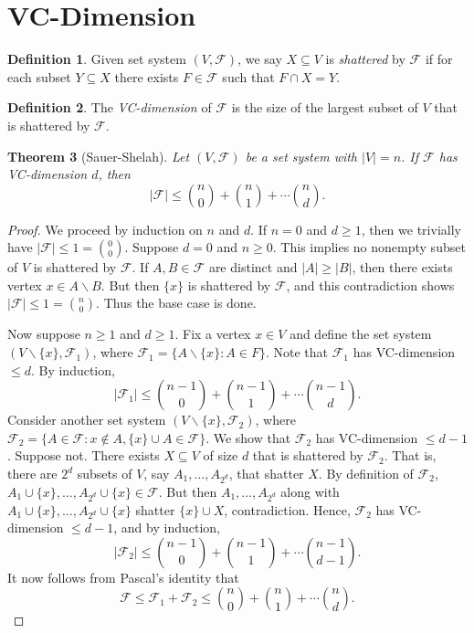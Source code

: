 \documentclass[12pt,reqno]{amsart}
\newtheorem{theorem}{Theorem}[section]
\theoremstyle{definition}
\newtheorem{definition}[theorem]{Definition}
\theoremstyle{remark}
\renewcommand{\leq}{\leqslant}
\renewcommand{\geq}{\geqslant}
\def\F{\mathcal{F}}
\numberwithin{equation}{section}
\begin{document}
\newpage

\section{VC-Dimension}

\begin{definition}
	Given set system $(V, \F)$, we say $X \subseteq V$ is \textit{shattered} by $\F$ if for each subset $Y \subseteq X$ there exists $F \in \F$ such that $F \cap X = Y$.
\end{definition}

\begin{definition}
	The \textit{VC-dimension} of $\F$ is the size of the largest subset of $V$ that is shattered by $\F$.
\end{definition}

\begin{theorem}[Sauer-Shelah]
	Let $(V, \F)$ be a set system with $|V| = n$. If $\F$ has VC-dimension $d$, then
	\[
		|\F| \leq \binom{n}{0} + \binom{n}{1} + \cdots \binom{n}{d}.
	\]
\end{theorem}

\begin{proof}
	We proceed by induction on $n$ and $d$. If $n = 0$ and $d \geq 1$, then we trivially have $|\F| \leq 1 = \binom{0}{0}$. Suppose $d = 0$ and $n \geq 0$. This implies no nonempty subset of $V$ is shattered by $\F$. If $A, B \in \F$ are distinct and $|A| \geq |B|$, then there exists vertex $x \in A \backslash B$. But then $\{x\}$ is shattered by $\F$, and this contradiction shows $|\F| \leq 1 = \binom{n}{0}$. Thus the base case is done.

	Now suppose $n \geq 1$ and $d \geq 1$. Fix a vertex $x \in V$ and define the set system $(V \backslash \{x\}, \F_1)$, where $\F_1 = \{A \backslash \{x\} : A \in F\}$. Note that $\F_1$ has VC-dimension $\leq d$. By induction, 
	\[
		|\F_1| \leq \binom{n - 1}{0} + \binom{n - 1}{1} + \cdots \binom{n - 1}{d}.
	\]
	Consider another set system $(V \backslash \{x\}, \F_2)$, where $\F_2 = \{A \in \F : x \notin A, \{x\} \cup A \in \F\}$. We show that $\F_2$ has VC-dimension $\leq d - 1$. Suppose not. There exists $X \subseteq V$ of size $d$ that is shattered by $\F_2$. That is, there are $2^{d}$ subsets of $V$, say $A_1, \ldots, A_{2^d}$, that shatter $X$. By definition of $\F_2$, $A_1 \cup \{x\}, \ldots, A_{2^d} \cup \{x\} \in \F$. But then $A_1, \ldots, A_{2^d}$ along with $A_1 \cup \{x\}, \ldots, A_{2^d} \cup \{x\}$ shatter $\{x\} \cup X$, contradiction. Hence, $\F_2$ has VC-dimension $\leq d - 1$, and by induction,
	\[
		|\F_2| \leq \binom{n - 1}{0} + \binom{n - 1}{1} + \cdots \binom{n - 1}{d - 1}.
	\]
	It now follows from Pascal's identity that
	\[
		\F \leq \F_1 + \F_2 \leq \binom{n}{0} + \binom{n}{1} + \cdots \binom{n}{d}.
	\]
\end{proof}
\end{document}
